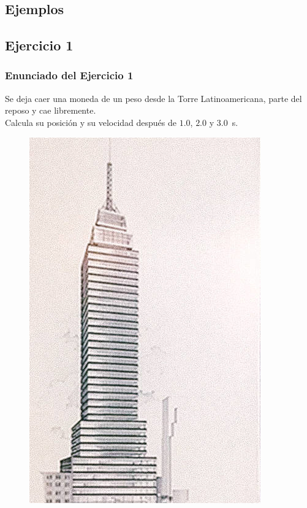 \documentclass[14pt]{beamer}
\begin{document}
\subsection{Ejemplos}
\subsection*{Ejercicio 1}

\begin{frame}
\frametitle{Enunciado del Ejercicio 1}
Se deja caer una moneda de un peso desde la Torre Latinoamericana, parte del reposo y cae libremente.
\\
\bigskip
\pause
Calcula su posición y su velocidad después de $1.0$, $2.0$ y \SI{3.0}{\second}.
\end{frame}
\begin{frame}[plain]
\begin{figure}
\centering
\includegraphics[scale=1.2]{Imagenes/Torre_Latino.jpg}
\end{figure}
\end{frame}
\end{document}
